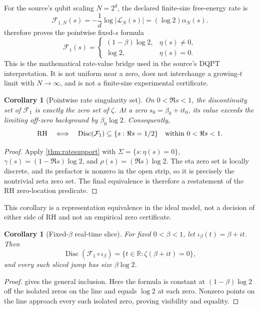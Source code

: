 \documentclass[11pt,a4paper]{article}
\theoremstyle{definition}
\theoremstyle{plain}
\newtheorem{corollary}[definition]{Corollary}
\theoremstyle{remark}
\begin{document}
For the source's qubit scaling \(N=2^d\), the declared finite-size
free-energy rate is
\[
 \mathcal F_{1,N}(s)
 =-\frac1d\log|\mathcal L_N(s)|
 =(\log2)\alpha_N(s).
\]
 therefore proves the pointwise fixed-\(s\) formula
\[
 \mathcal F_1(s)
 =
 \begin{cases}
  (1-\beta)\log2,&\eta(s)\ne0,\\
  \log2,&\eta(s)=0.
 \end{cases}
\]
This is the mathematical rate-value bridge used in the source's DQPT
interpretation.  It is not uniform near a zero, does not interchange a
growing-\(t\) limit with \(N\to\infty\), and is not a finite-size
experimental certificate.

\begin{corollary}[Pointwise rate singularity set]\label{cor:eta-rate-sing}
On \(0<\Re s<1\), the discontinuity set of \(\mathcal F_1\) is exactly the
zero set of \(\zeta\).  At a zero \(s_0=\beta_0+it_0\), its value exceeds the
limiting off-zero background by \(\beta_0\log2\).  Consequently,
\[
 {\rm RH}
 \quad\Longleftrightarrow\quad
 \operatorname{Disc}(\mathcal F_1)
 \subseteq\{s:\Re s=1/2\}
 \quad\text{within }0<\Re s<1.
\]
\end{corollary}
\begin{proof}
Apply \cref{thm:ratesupport} with
\(\Sigma=\{s:\eta(s)=0\}\),
\(\gamma(s)=(1-\Re s)\log2\), and
\(\rho(s)=(\Re s)\log2\).  The eta zero set is locally discrete, and its
prefactor is nonzero in the open strip, so it is precisely the nontrivial zeta
zero set.  The final equivalence is therefore a restatement of the RH
zero-location predicate.
\end{proof}
This corollary is a representation equivalence in the ideal model, not a
decision of either side of RH and not an empirical zero certificate.

\begin{corollary}[Fixed-\(\beta\) real-time slice]\label{cor:eta-timeslice}
For fixed \(0<\beta<1\), let
\(\iota_\beta(t)=\beta+it\).  Then
\[
 \operatorname{Disc}(\mathcal F_1\circ\iota_\beta)
 =
 \{t\in\mathbb R:\zeta(\beta+it)=0\},
\]
and every such sliced jump has size \(\beta\log2\).
\end{corollary}
\begin{proof}
 gives the general inclusion.  Here the formula is
constant at \((1-\beta)\log2\) off the isolated zeros on the line and equals
\(\log2\) at each zero.  Nonzero points on the line approach every such
isolated zero, proving visibility and equality.
\end{proof}
\end{document}
